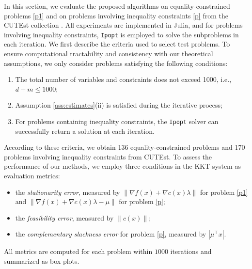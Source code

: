 \documentclass[11pt]{article}
\begin{document}
In this section, we evaluate the proposed algorithms on equality-constrained problems \eqref{p1} and on problems involving inequality constraints \eqref{p} from the CUTEst collection \cite{gould2015cutest}. All experiments are implemented in Julia, and for problems involving inequality constraints, \texttt{Ipopt}  is employed to solve the subproblems in each iteration. We first describe the criteria used to select test problems. To ensure computational tractability and consistency with our theoretical assumptions, we only consider problems satisfying the following conditions:
\begin{enumerate}
    \item[(1)] The total number of variables and constraints does not exceed 1000, i.e., $d + m \le 1000$;
    \item[(2)] Assumption \ref{ass:estimates}(ii) is satisfied during the iterative process;
    \item[(3)] For problems containing inequality constraints, the \texttt{Ipopt}  solver can successfully return a solution at each iteration.
\end{enumerate}
According to these criteria, we obtain 136 equality-constrained problems and 170 problems involving inequality constraints from CUTEst. To assess the performance of our methods, we employ three conditions in the  KKT system as evaluation metrics:
\begin{itemize}
    \item the \textit{stationarity error}, measured by $\|\nabla f(x) + \nabla c(x)\lambda\|$ for problem \eqref{p1} and $\|\nabla f(x) + \nabla c(x)\lambda - \mu\|$ for problem \eqref{p};
    \item the \textit{feasibility error}, measured by $\|c(x)\|$;
    \item the \textit{complementary slackness error} for problem \eqref{p}, measured by $|\mu^\top x|$.
\end{itemize}
All metrics are computed for each problem within \(1000\) iterations and summarized as box plots.
\end{document}
